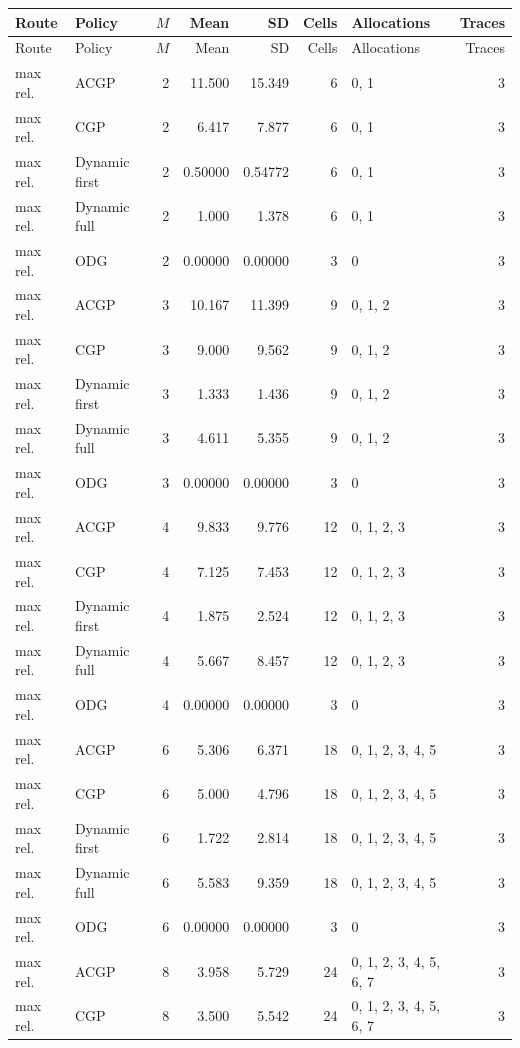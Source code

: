 \documentclass[10pt,a4paper]{article}
\begin{document}
\tiny\setlength{\tabcolsep}{2pt}\begin{longtable}{@{}p{23mm}p{29mm}rrrrp{36mm}r@{}}
\toprule Route & Policy & $M$ & Mean & SD & Cells & Allocations & Traces \\ \midrule\endfirsthead
\toprule Route & Policy & $M$ & Mean & SD & Cells & Allocations & Traces \\ \midrule\endhead
\bottomrule\endfoot
max rel. & ACGP & 2 & 11.500 & 15.349 & 6 & 0, 1 & 3 \\
max rel. & CGP & 2 & 6.417 & 7.877 & 6 & 0, 1 & 3 \\
max rel. & Dynamic first & 2 & 0.50000 & 0.54772 & 6 & 0, 1 & 3 \\
max rel. & Dynamic full & 2 & 1.000 & 1.378 & 6 & 0, 1 & 3 \\
max rel. & ODG & 2 & 0.00000 & 0.00000 & 3 & 0 & 3 \\
max rel. & ACGP & 3 & 10.167 & 11.399 & 9 & 0, 1, 2 & 3 \\
max rel. & CGP & 3 & 9.000 & 9.562 & 9 & 0, 1, 2 & 3 \\
max rel. & Dynamic first & 3 & 1.333 & 1.436 & 9 & 0, 1, 2 & 3 \\
max rel. & Dynamic full & 3 & 4.611 & 5.355 & 9 & 0, 1, 2 & 3 \\
max rel. & ODG & 3 & 0.00000 & 0.00000 & 3 & 0 & 3 \\
max rel. & ACGP & 4 & 9.833 & 9.776 & 12 & 0, 1, 2, 3 & 3 \\
max rel. & CGP & 4 & 7.125 & 7.453 & 12 & 0, 1, 2, 3 & 3 \\
max rel. & Dynamic first & 4 & 1.875 & 2.524 & 12 & 0, 1, 2, 3 & 3 \\
max rel. & Dynamic full & 4 & 5.667 & 8.457 & 12 & 0, 1, 2, 3 & 3 \\
max rel. & ODG & 4 & 0.00000 & 0.00000 & 3 & 0 & 3 \\
max rel. & ACGP & 6 & 5.306 & 6.371 & 18 & 0, 1, 2, 3, 4, 5 & 3 \\
max rel. & CGP & 6 & 5.000 & 4.796 & 18 & 0, 1, 2, 3, 4, 5 & 3 \\
max rel. & Dynamic first & 6 & 1.722 & 2.814 & 18 & 0, 1, 2, 3, 4, 5 & 3 \\
max rel. & Dynamic full & 6 & 5.583 & 9.359 & 18 & 0, 1, 2, 3, 4, 5 & 3 \\
max rel. & ODG & 6 & 0.00000 & 0.00000 & 3 & 0 & 3 \\
max rel. & ACGP & 8 & 3.958 & 5.729 & 24 & 0, 1, 2, 3, 4, 5, 6, 7 & 3 \\
max rel. & CGP & 8 & 3.500 & 5.542 & 24 & 0, 1, 2, 3, 4, 5, 6, 7 & 3 \\

\end{longtable}
\end{document}
